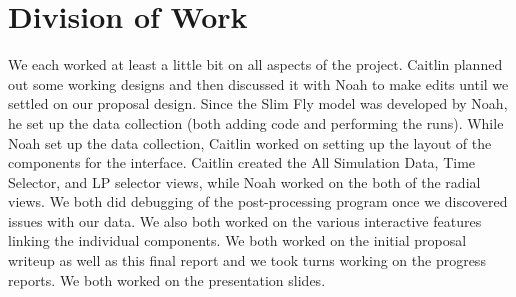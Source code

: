 \documentclass{acm_proc_article-sp}
\begin{document}
\section{Division of Work}
We each worked at least a little bit on all aspects of the project.  Caitlin planned out some working designs and then discussed it with Noah to make edits until we settled on our proposal design.  Since the Slim Fly model was developed by Noah, he set up the data collection (both adding code and performing the runs).  While Noah set up the data collection, Caitlin worked on setting up the layout of the components for the interface.  Caitlin created the All Simulation Data, Time Selector, and LP selector views, while Noah worked on the both of the radial views.  We both did debugging of the post-processing program once we discovered issues with our data.  We also both worked on the various interactive features linking the individual components.  We both worked on the initial proposal writeup as well as this final report and we took turns working on the progress reports.  We both worked on the presentation slides.  





%

%
%


\end{document}
